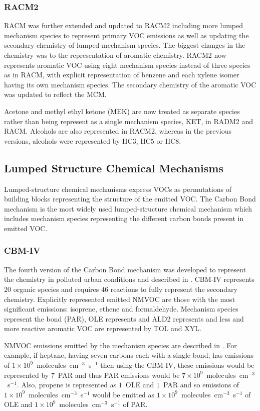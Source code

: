 \subsubsection{RACM2}
RACM was further extended and updated to RACM2 \citep{Goliff:2013} including more lumped mechanism species to represent primary VOC emissions as well as updating the secondary chemistry of lumped mechanism species.
The biggest changes in the chemistry was to the representation of aromatic chemistry.
RACM2 now represents aromatic VOC using eight mechanism species instead of three species as in RACM, with explicit representation of benzene and each xylene isomer having its own mechanism species.
The secondary chemistry of the aromatic VOC was updated to reflect the MCM.

Acetone and methyl ethyl ketone (MEK) are now treated as separate species rather than being represent as a single mechanism species, KET, in RADM2 and RACM.
Alcohols are also represented in RACM2, whereas in the previous versions, alcohols were represented by HC3, HC5 or HC8.

\subsection{Lumped Structure Chemical Mechanisms} \label{ss:lumped_structure}
Lumped-structure chemical mechanisms express VOCs as permutations of building blocks representing the structure of the emitted VOC.
The Carbon Bond mechanism is the most widely used lumped-structure chemical mechanism which includes mechanism species representing the different carbon bonds present in emitted VOC.

\subsubsection{CBM-IV}
The fourth version of the Carbon Bond mechanism was developed to represent the chemistry in polluted urban conditions and described in \citet{Gery:1989}.
CBM-IV represents $20$ organic species and requires $46$ reactions to fully represent the secondary chemistry.
Explicitly represented emitted NMVOC are those with the most significant emissions: isoprene, ethene and formaldehyde.
Mechanism species represent the  bond (PAR), OLE represents  and ALD2 represents  and less and more reactive aromatic VOC are represented by TOL and XYL. 

NMVOC emissions emitted by the mechanism species are described in \citet{Hogo:1989}.
For example, if heptane, having seven carbons each with a single bond, has emissions of $1 \times 10^9$~molecules~cm$^{-3}$~s$^{-1}$ then using the CBM-IV, these emissions would be represented by $7$~PAR and thus PAR emissions would be $7 \times 10^9$~molecules~cm$^{-3}$~s$^{-1}$.
Also, propene is represented as $1$~OLE and $1$~PAR and so emissions of $1 \times 10^9$~molecules~cm$^{-3}$~s$^{-1}$  would be emitted as $1 \times 10^9$~molecules~cm$^{-3}$~s$^{-1}$ of OLE and $1 \times 10^9$~molecules~cm$^{-3}$~s$^{-1}$ of PAR.


